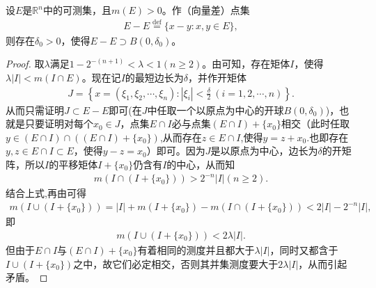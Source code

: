 \documentclass[../../main.tex]{subfiles}%
\begin{document}
\begin{theorem}[Steinhaus定理]\label{theorem:Steinhaus定理}
设\(E\)是\(\mathbb{R}^n\)中的可测集，且\(m(E)>0\)。作（向量差）点集
\begin{align*}
E - E \stackrel{\text{def}}{=} \{x - y: x,y \in E\},
\end{align*}
则存在\(\delta_0>0\)，使得\(E - E \supset B(0,\delta_0)\)。
\end{theorem}
\begin{proof}

取\(\lambda\)满足\(1 - 2^{-(n + 1)}<\lambda<1\)$(n\geqslant  2)$。由可知，存在矩体\(I\)，使得\(\lambda|I|<m(I\cap E)\)。现在记\(I\)的最短边长为\(\delta\)，并作开矩体
\begin{align*}
J = \left\{x = (\xi_1,\xi_2,\cdots,\xi_n): |\xi_i|<\frac{\delta}{2}\ (i = 1,2,\cdots,n)\right\}.
\end{align*}
从而只需证明\(J\subset E - E\)即可(在$J$中任取一个以原点为中心的开球$B(0,\delta_0)$)，也就是只要证明对每个\(x_0\in J\)，点集\(E\cap I\)必与点集\((E\cap I)+\{x_0\}\)相交（此时任取$y\in (E\cap I)\cap((E\cap I)+\{x_0\})$,从而存在$z\in E\cap I$,使得$y=z+x_0$.也即存在\(y,z\in E\cap I\subset E\)，使得\(y - z = x_0\)）即可。因为\(J\)是以原点为中心，边长为\(\delta\)的开矩阵，所以\(I\)的平移矩体\(I+\{x_0\}\)仍含有\(I\)的中心，从而知
\begin{align*}
m(I\cap (I+\{x_0\}))>2^{-n}|I|(n\geqslant  2).
\end{align*}
结合上式,再由可得
\begin{align*}
m(I\cup (I+\{x_0\}))=|I|+m(I+\{x_0\})-m(I\cap (I+\{x_0\}))
<2|I|-2^{-n}|I|,
\end{align*}
即
\begin{align*}
m(I\cup (I+\{x_0\}))<2\lambda|I|.
\end{align*}
但由于\(E\cap I\)与\((E\cap I)+\{x_0\}\)有着相同的测度并且都大于\(\lambda|I|\)，同时又都含于\(I\cup (I+\{x_0\})\)之中，故它们必定相交，否则其并集测度要大于\(2\lambda|I|\)，从而引起矛盾。

\end{proof} 
\end{document}

